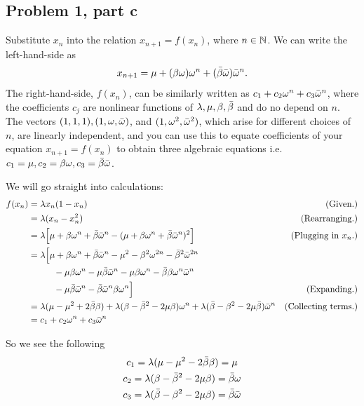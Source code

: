\subsection{Problem 1, part c}
Substitute $x_n$ into the relation $x_{n+1} = f(x_n)$, where $n \in \mathbb{N}$. We can write the left-hand-side as 
\[
x_{n+1} = \mu + (\beta\omega)\omega^n + (\Bar{\beta}\Bar{\omega})\Bar{\omega}^n.
\]
The right-hand-side, $f(x_n)$, can be similarly written as $c_1 + c_2\omega^n + c_3\Bar{\omega}^n$, where the coefficients $c_j$ are nonlinear functions of $\lambda, \mu, \beta, \Bar{\beta}$ and do no depend on $n$. The vectors $(1, 1, 1), (1, \omega, \Bar{\omega})$, and $(1, \omega^2, \Bar{\omega}^2)$, which arise for different choices of $n$, are linearly independent, and you can use this to equate coefficients of your equation $x_{n+1} = f(x_n)$ to obtain three algebraic equations i.e. $c_1 = \mu, c_2 = \beta\omega, c_3 = \Bar{\beta}\Bar{\omega}$.
\partbreak
\begin{solution}

    We will go straight into calculations:
    \alignbreak
    \begin{align}
        f(x_n) &= \lm x_n(1 - x_n) &\text{(Given.)}\nonumber\\
        &= \lm (x_n - x_n^2) &\text{(Rearranging.)}\nonumber\\
        &= \lm\Big[ \mu + \beta\omega^n + \Bar{\beta}\Bar{\omega}^n - (\mu + \beta\omega^n + \Bar{\beta}\Bar{\omega}^n)^2\Big] &\text{(Plugging in $x_n$.)}\nonumber\\
        &= \lm\Big[ \mu + \beta\omega^n + \Bar{\beta}\Bar{\omega}^n - \mu^2 - \beta^2\omega^{2n} - \Bar{\beta}^2\Bar{\omega}^{2n}\nonumber\\
        & \hspace{10mm} - \mu\beta\omega^n - \mu\Bar{\beta}\Bar{\omega}^n - \mu\beta\omega^n - \Bar{\beta}\beta\omega^n \Bar{\omega}^n \nonumber\\
        & \hspace{10mm} - \mu\Bar{\beta}\Bar{\omega}^n - \Bar{\beta}\Bar{\omega}^n\beta\omega^n \Big] &\text{(Expanding.)}\nonumber\\
        &= \lm (\mu - \mu^2 + 2\Bar{\beta}\beta) + \lm (\beta - \Bar{\beta}^2 - 2\mu \beta)\omega^n + \lm (\Bar{\beta} - \beta^2 - 2\mu\Bar{\beta})\bar{\omega}^n &\text{(Collecting terms.)}\nonumber\\
        &= c_1 + c_2\omega^n + c_3\bar{\omega}^n\nonumber
    \end{align}
    \alignbreak

    So we see the following
    \begin{gather}
        c_1 = \lambda(\mu - \mu^2 - 2\Bar{\beta}\beta) = \mu \label{p1c: eq1}\\ 
        c_2 = \lambda(\beta - \Bar{\beta}^2 - 2\mu\beta) = \Bar{\beta}\omega \label{p1c: eq2}\\
        c_3 = \lambda(\Bar{\beta} - \beta^2 - 2\mu\beta) = \Bar{\beta}\Bar{\omega} \label{p1c: eq3}
    \end{gather}
\end{solution}
\newpage
